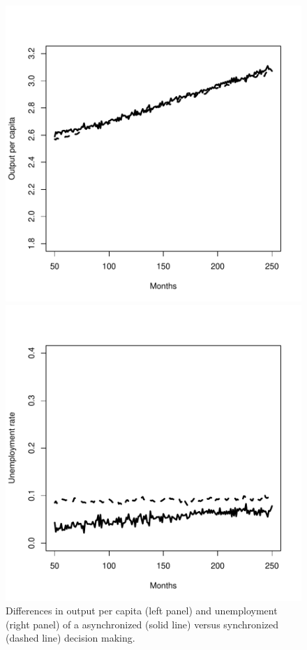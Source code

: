 \begin{figure}[t]
\begin{minipage}[b]{.46\linewidth}
\centering\includegraphics[scale =0.4]{./robustness/gdp_synchron.pdf}
\end{minipage}\hfill
\begin{minipage}[b]{.46\linewidth}
\centering\includegraphics[scale=0.4]{./robustness/unemployment_synchron.pdf}
\end{minipage}
\caption{Differences in output per capita (left panel) and unemployment (right panel) of a asynchronized (solid line) versus synchronized (dashed line) decision making.}
\label{synchron_variation}
\end{figure}

